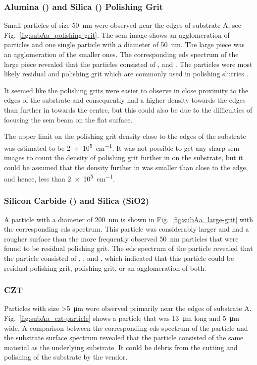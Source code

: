\subsubsection{Alumina () and Silica () Polishing Grit}
Small particles of size \SI{50}{\nano\metre} were observed near the edges of substrate A, see Fig.~\ref{fig:subAa_polishing-grit}. The \ac{sem} image shows an agglomeration of particles and one single particle with a diameter of \SI{50}{\nano\metre}. The large piece was an agglomeration of the smaller ones. The corresponding \ac{eds} spectrum of the large piece revealed that the particles consisted of ,  and . The particles were most likely residual  and  polishing grit which are commonly used in polishing slurries \citep{benson2015as-received}. 

It seemed like the polishing grits were easier to observe in close proximity to the edges of the substrate and consequently had a higher density towards the edges than further in towards the centre, but this could also be due to the difficulties of focusing the \ac{sem} beam on the flat surface. 

The upper limit on the polishing grit density close to the edges of the substrate was estimated to be \SI{2e5}{\centi\metre^{-1}}. It was not possible to get any sharp \ac{sem} images to count the density of polishing grit further in on the substrate, but it could be assumed that the density further in was smaller than close to the edge, and hence, less than \SI{2e5}{\centi\metre^{-1}}.

\subsubsection{Silicon Carbide () and Silica (SiO2)}
A particle with a diameter of \SI{200}{\nano\metre} is shown in Fig.~\ref{fig:subAa_large-grit} with the corresponding \ac{eds} spectrum. This particle was considerably larger and had a rougher surface than the more frequently observed \SI{50}{\nano\metre} particles that were found to be residual polishing grit. The \ac{eds} spectrum of the particle revealed that the particle consisted of , , and , which indicated that this particle could be residual  polishing grit,  polishing grit, or an agglomeration of both. 


\subsubsection{CZT}
Particles with size \SI{>5}{\micro\metre} were observed primarily near the edges of substrate A. Fig.~\ref{fig:subAa_czt-particle} shows a particle that was \SI{13}{\micro\metre} long and \SI{5}{\micro\metre} wide. A comparison between the corresponding \ac{eds} spectrum of the particle and the substrate surface spectrum revealed that the particle consisted of the same material as the underlying substrate. It could be debris from the cutting and polishing of the substrate by the vendor.


